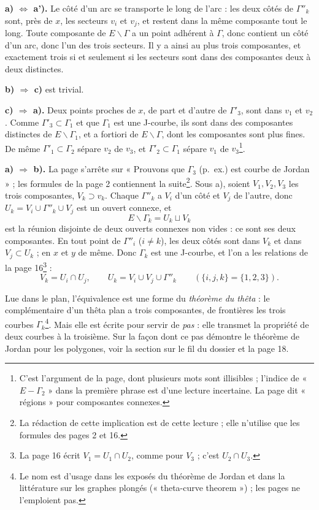 \documentclass[11pt,a4paper]{article}
\begin{document}
\textbf{a) $\Leftrightarrow$ a').} Le côté d'un arc se transporte le long de
l'arc : les deux côtés de $\Gamma''_k$ sont, près de $x$, les secteurs $v_i$ et
$v_j$, et restent dans la même composante tout le long. Toute composante de $E
\smallsetminus \Gamma$ a un point adhérent à $\Gamma$, donc contient un côté
d'un arc, donc l'un des trois secteurs. Il y a ainsi au plus trois composantes,
et exactement trois si et seulement si les secteurs sont dans des composantes
deux à deux distinctes.

\textbf{b) $\Rightarrow$ c)} est trivial.

\textbf{c) $\Rightarrow$ a).} Deux points proches de $x$, de part et d'autre
de $\Gamma'_3$, sont dans $v_1$ et $v_2$. Comme $\Gamma'_3 \subset \Gamma_1$ et
que $\Gamma_1$ est une J-courbe, ils sont dans des composantes distinctes de $E
\smallsetminus \Gamma_1$, et a fortiori de $E \smallsetminus \Gamma$, dont les
composantes sont plus fines. De même $\Gamma'_1 \subset \Gamma_2$ sépare $v_2$
de $v_3$, et $\Gamma'_2 \subset \Gamma_1$ sépare $v_1$ de $v_3$\footnote{C'est
l'argument de la page, dont plusieurs mots sont illisibles ; l'indice de
« $E - \Gamma_2$ » dans la première phrase est d'une lecture incertaine. La
page dit « régions » pour composantes connexes.}.

\textbf{a) $\Rightarrow$ b).} La page s'arrête sur « Prouvons que $\Gamma_3$
(p.\ ex.) est courbe de Jordan » ; les formules de la page 2 contiennent la
suite\footnote{La rédaction de cette implication est de cette lecture ; elle
n'utilise que les formules des pages 2 et 16.}. Sous a), soient $V_1, V_2, V_3$
les trois composantes, $V_k \supset v_k$. Chaque $\Gamma''_k$ a $V_i$ d'un côté
et $V_j$ de l'autre, donc $U_k = V_i \cup \Gamma''_k \cup V_j$ est un ouvert
connexe, et
\[
E \smallsetminus \Gamma_k = U_k \sqcup V_k
\]
est la réunion disjointe de deux ouverts connexes non vides : ce sont ses deux
composantes. En tout point de $\Gamma''_i$ ($i \neq k$), les deux côtés sont
dans $V_k$ et dans $V_j \subset U_k$ ; en $x$ et $y$ de même. Donc $\Gamma_k$
est une J-courbe, et l'on a les relations de la page 16\footnote{La page 16 écrit $V_1 = U_1 \cap U_2$, comme pour $V_3$ ; c'est $U_2
\cap U_3$.} :
\[
V_k = U_i \cap U_j, \qquad U_k = V_i \cup V_j \cup \Gamma''_k
\qquad (\{i, j, k\} = \{1, 2, 3\}).
\]


Lue dans le plan, l'équivalence est une forme du \emph{théorème du thêta} : le
complémentaire d'un thêta plan a trois composantes, de frontières les trois
courbes $\Gamma_k$\footnote{Le nom est d'usage dans les exposés du théorème de
Jordan et dans la littérature sur les graphes plongés (« theta-curve
theorem ») ; les pages ne l'emploient pas.}. Mais elle est écrite pour servir de
\emph{pas} : elle transmet la propriété de deux courbes à la troisième. Sur la
façon dont ce pas démontre le théorème de Jordan pour les polygones, voir la
section sur le fil du dossier et la page 18.
\end{document}
